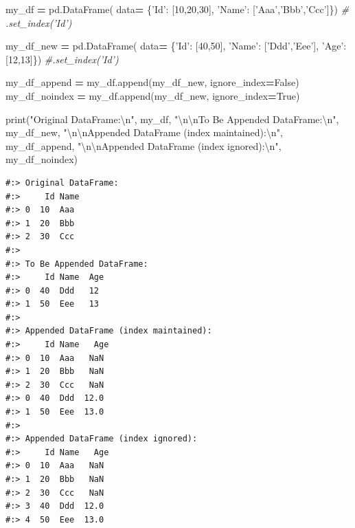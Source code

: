 \documentclass[
]{book}
\newenvironment{Shaded}{\begin{snugshade}}{\end{snugshade}}
\newcommand{\BuiltInTok}[1]{#1}
\newcommand{\CharTok}[1]{\textcolor[rgb]{0.5,0.5,0.5}{#1}}
\newcommand{\CommentTok}[1]{\textcolor[rgb]{0.37,0.37,0.37}{\textit{#1}}}
\newcommand{\DecValTok}[1]{\textcolor[rgb]{0.06,0.06,0.06}{#1}}
\newcommand{\NormalTok}[1]{#1}
\newcommand{\OperatorTok}[1]{\textcolor[rgb]{0.43,0.43,0.43}{\textbf{#1}}}
\newcommand{\StringTok}[1]{\textcolor[rgb]{0.5,0.5,0.5}{#1}}
\newcommand{\VariableTok}[1]{\textcolor[rgb]{0,0,0}{#1}}
\begin{document}
\begin{Shaded}
\begin{Highlighting}[]
\NormalTok{my_df }\OperatorTok{=}\NormalTok{ pd.DataFrame(}
\NormalTok{          data}\OperatorTok{=}\NormalTok{ \{}\StringTok{'Id'}\NormalTok{:   [}\DecValTok{10}\NormalTok{,}\DecValTok{20}\NormalTok{,}\DecValTok{30}\NormalTok{],}
                 \StringTok{'Name'}\NormalTok{: [}\StringTok{'Aaa'}\NormalTok{,}\StringTok{'Bbb'}\NormalTok{,}\StringTok{'Ccc'}\NormalTok{]\})}
\CommentTok{#                 .set_index('Id')}
                 
\NormalTok{my_df_new }\OperatorTok{=}\NormalTok{ pd.DataFrame(}
\NormalTok{            data}\OperatorTok{=}\NormalTok{ \{}\StringTok{'Id'}\NormalTok{:   [}\DecValTok{40}\NormalTok{,}\DecValTok{50}\NormalTok{],}
                   \StringTok{'Name'}\NormalTok{: [}\StringTok{'Ddd'}\NormalTok{,}\StringTok{'Eee'}\NormalTok{],}
                   \StringTok{'Age'}\NormalTok{:  [}\DecValTok{12}\NormalTok{,}\DecValTok{13}\NormalTok{]\})  }
                   \CommentTok{#.set_index('Id')}
                   
\NormalTok{my_df_append  }\OperatorTok{=}\NormalTok{ my_df.append(my_df_new, ignore_index}\OperatorTok{=}\VariableTok{False}\NormalTok{)}
\NormalTok{my_df_noindex }\OperatorTok{=}\NormalTok{ my_df.append(my_df_new, ignore_index}\OperatorTok{=}\VariableTok{True}\NormalTok{)}

\BuiltInTok{print}\NormalTok{(}\StringTok{"Original DataFrame:}\CharTok{\textbackslash{}n}\StringTok{"}\NormalTok{, my_df,}
      \StringTok{"}\CharTok{\textbackslash{}n\textbackslash{}n}\StringTok{To Be Appended DataFrame:}\CharTok{\textbackslash{}n}\StringTok{"}\NormalTok{, my_df_new,}
      \StringTok{"}\CharTok{\textbackslash{}n\textbackslash{}n}\StringTok{Appended DataFrame (index maintained):}\CharTok{\textbackslash{}n}\StringTok{"}\NormalTok{, my_df_append,}
      \StringTok{"}\CharTok{\textbackslash{}n\textbackslash{}n}\StringTok{Appended DataFrame (index ignored):}\CharTok{\textbackslash{}n}\StringTok{"}\NormalTok{, my_df_noindex)}
\end{Highlighting}
\end{Shaded}

\begin{verbatim}
#:> Original DataFrame:
#:>     Id Name
#:> 0  10  Aaa
#:> 1  20  Bbb
#:> 2  30  Ccc 
#:> 
#:> To Be Appended DataFrame:
#:>     Id Name  Age
#:> 0  40  Ddd   12
#:> 1  50  Eee   13 
#:> 
#:> Appended DataFrame (index maintained):
#:>     Id Name   Age
#:> 0  10  Aaa   NaN
#:> 1  20  Bbb   NaN
#:> 2  30  Ccc   NaN
#:> 0  40  Ddd  12.0
#:> 1  50  Eee  13.0 
#:> 
#:> Appended DataFrame (index ignored):
#:>     Id Name   Age
#:> 0  10  Aaa   NaN
#:> 1  20  Bbb   NaN
#:> 2  30  Ccc   NaN
#:> 3  40  Ddd  12.0
#:> 4  50  Eee  13.0
\end{verbatim}
\end{document}
